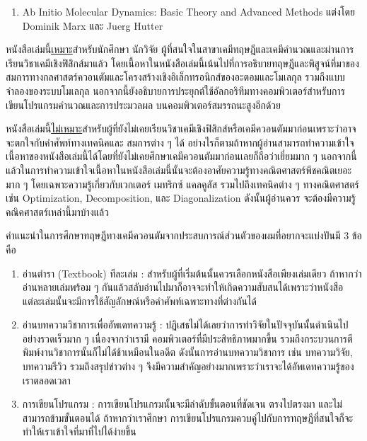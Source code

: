 {\begin{enumerate}[topsep=0pt,noitemsep]
    \item Ab Initio Molecular Dynamics: Basic Theory and Advanced Methods
    แต่งโดย Dominik Marx และ Juerg Hutter\autocite{marx2009}
    
\end{enumerate}

หนังสือเล่มนี้\underline{เหมาะ}สำหรับนักศึกษา นักวิจัย ผู้ที่สนใจในสาขาเคมีทฤษฎีและเคมีคำนวณและผ่านการเรียนวิชาเคมีเชิงฟิสิกส์มาแล้ว 
โดยเนื้อหาในหนังสือเล่มนี้เน้นไปที่การอธิบายทฤษฎีและพิสูจน์ที่มาของสมการทางกลศาสตร์ควอนตัมและโครงสร้างเชิงอิเล็กทรอนิกส์ของอะตอมและโมเลกุล%
รวมถึงแบบจำลองของระบบโมเลกุล นอกจากนี้ยังอธิบายการประยุกต์ใช้อัลกอริทึมทางคอมพิวเตอร์สำหรับการเขียนโปรแกรมคำนวณและการประมวลผล%
บนคอมพิวเตอร์สมรรถนะสูงอีกด้วย

หนังสือเล่มนี้\underline{ไม่เหมาะ}สำหรับผู้ที่ยังไม่เคยเรียนวิชาเคมีเชิงฟิสิกส์หรือเคมีควอนตัมมาก่อนเพราะว่าอาจจะตกใจกับคำศัพท์ทางเทคนิคและ%
สมการต่าง ๆ ได้ อย่างไรก็ตามถ้าหากผู้อ่านสามารถทำความเข้าใจเนื้อหาของหนังสือเล่มนี้ได้โดยที่ยังไม่เคยศึกษาเคมีควอนตัมมาก่อนเลยก็ถือว่าเยี่ยมมาก ๆ 
นอกจากนี้แล้วในการทำความเข้าใจเนื้อหาในหนังสือเล่มนี้นั้นจะต้องอาศัยความรู้ทางคณิตศาสตร์พีชคณิตเยอะมาก ๆ โดยเฉพาะความรู้เกี่ยวกับเวกเตอร์ 
เมทริกซ์ แคลคูลัส รวมไปถึงเทคนิคต่าง ๆ ทางคณิตศาสตร์ เช่น Optimization, Decomposition, และ Diagonalization ดังนั้นผู้อ่านควร%
จะต้องมีความรู้คณิคศาสตร์เหล่านี้มาบ้างแล้ว

คำแนะนำในการศึกษาทฤษฎีทางเคมีควอนตัมจากประสบการณ์ส่วนตัวของผมที่อยากจะแบ่งปันมี 3 ข้อคือ 

\begin{enumerate}[topsep=0pt,noitemsep]
    \setlength\itemsep{1em}
    \item อ่านตำรา (Textbook) ทีละเล่ม : สำหรับผู้ที่เริ่มต้นนั้นควรเลือกหนังสือเพียงเล่มเดียว ถ้าหากว่าอ่านหลายเล่มพร้อม ๆ 
    กันแล้วสลับอ่านไปมาก็อาจจะทำให้เกิดความสับสนได้เพราะว่าหนังสือแต่ละเล่มนั้นจะมีการใช้สัญลักษณ์หรือคำศัพท์เฉพาะทางที่ต่างกันได้
    
    \item อ่านบทความวิชาการเพื่ออัพเดทความรู้ : ปฏิเสธไม่ได้เลยว่าการทำวิจัยในปัจจุบันนั้นดำเนินไปอย่างรวดเร็วมาก ๆ เนื่องจากว่าเรามี%
    คอมพิวเตอร์ที่มีประสิทธิภาพมากขึ้น รวมถึงกระบวนการตีพิมพ์งานวิชาการนั้นก็ไม่ได้ช้าเหมือนในอดีต ดังนั้นการอ่านบทความวิชาการ เช่น 
    บทความวิจัย, บทความรีวิว รวมถึงสรุปข่าวต่าง ๆ จึงมีความสำคัญอย่างมากเพราะว่าเราจะได้อัพเดทความรู้ของเราตลอดเวลา

    \item การเขียนโปรแกรม : การเขียนโปรแกรมนั้นจะมีลำดับขั้นตอนที่ชัดเจน ตรงไปตรงมา และไม่สามารถข้ามขั้นตอนได้ ถ้าหากว่าเราศึกษา%
    การเขียนโปรแกรมควบคู่ไปกับการทฤษฎีที่สนใจก็จะทำให้เราเข้าใจที่มาที่ไปได้ง่ายขึ้น
\end{enumerate}

}

